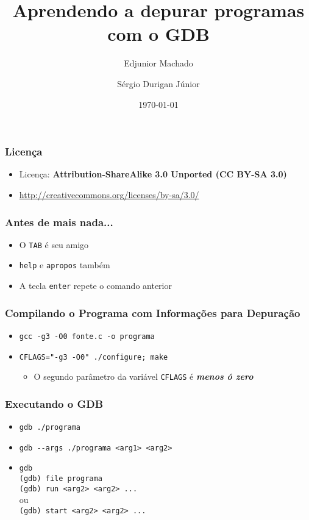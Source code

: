 \documentclass[xcolor=pdftex,dvipsnames,table,t]{beamer}
\title{Aprendendo a depurar programas com o GDB}
\author{Edjunior Machado \and
	Sérgio Durigan Júnior}
\date[Unicamp]{\today}
\begin{document}

\begin{frame}
	\frametitle{Licença}
	\begin{itemize}
		\item{Licença: \textbf{Attribution-ShareAlike 3.0 Unported (CC BY-SA 3.0)}}
		\item{\url{http://creativecommons.org/licenses/by-sa/3.0/}}
	\end{itemize}
\end{frame}

\begin{frame}[fragile]
	\frametitle{Antes de mais nada...}
	\begin{itemize}
	  \item{O \verb|TAB| é seu amigo}
	  \item{\verb|help| e \verb|apropos| também}
	  \item{A tecla \verb|enter| repete o comando anterior}
	\end{itemize}
\end{frame}

\begin{frame}[fragile]
	\frametitle{Compilando o Programa com Informações para Depuração}
	  \begin{itemize}
	    \item{\verb|gcc -g3 -O0 fonte.c -o programa|}
	    \item{\verb|CFLAGS="-g3 -O0" ./configure; make|}
	      \begin{itemize}
		\item{O segundo parâmetro da variável \verb|CFLAGS| é \textbf{\textit{menos ó zero}}}
	      \end{itemize}
	  \end{itemize}
\end{frame}

\begin{frame}[fragile]
	\frametitle{Executando o GDB}
	  \begin{itemize}
	    \item{\verb|gdb ./programa|}
	    \item{\verb|gdb --args ./programa <arg1> <arg2>|}
	    \item{\verb|gdb| \\
		\verb|(gdb) file programa| \\
		\verb|(gdb) run <arg2> <arg2> ...|\\
		ou\\
		\verb|(gdb) start <arg2> <arg2> ...|}
	  \end{itemize}
\end{frame}
\end{document}
